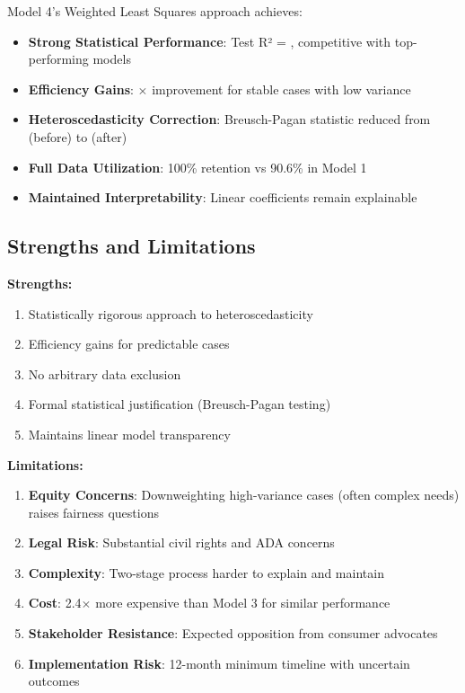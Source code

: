 Model 4's Weighted Least Squares approach achieves:
\begin{itemize}
    \item \textbf{Strong Statistical Performance}: Test R² = \ModelFourRSquaredTest{}, competitive with top-performing models
    \item \textbf{Efficiency Gains}: \ModelFourEfficiencyRatio{}$\times$ improvement for stable cases with low variance
    \item \textbf{Heteroscedasticity Correction}: Breusch-Pagan statistic reduced from \ModelFourBreuschPagan{} (before) to \ModelFourBreuschPaganAfter{} (after)
    \item \textbf{Full Data Utilization}: 100\% retention vs 90.6\% in Model 1
    \item \textbf{Maintained Interpretability}: Linear coefficients remain explainable
\end{itemize}

\subsection{Strengths and Limitations}

\textbf{Strengths:}
\begin{enumerate}
    \item Statistically rigorous approach to heteroscedasticity
    \item Efficiency gains for predictable cases
    \item No arbitrary data exclusion
    \item Formal statistical justification (Breusch-Pagan testing)
    \item Maintains linear model transparency
\end{enumerate}

\textbf{Limitations:}
\begin{enumerate}
    \item \textbf{Equity Concerns}: Downweighting high-variance cases (often complex needs) raises fairness questions
    \item \textbf{Legal Risk}: Substantial civil rights and ADA concerns
    \item \textbf{Complexity}: Two-stage process harder to explain and maintain
    \item \textbf{Cost}: 2.4$\times$ more expensive than Model 3 for similar performance
    \item \textbf{Stakeholder Resistance}: Expected opposition from consumer advocates
    \item \textbf{Implementation Risk}: 12-month minimum timeline with uncertain outcomes
\end{enumerate}

